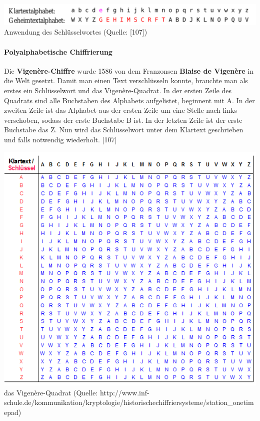 \documentclass[12pt,a4paper]{report}
\begin{document}
\begin{onehalfspace}
\begin{center}
\includegraphics[scale=0.38]{img/schluesselwortes.png}\\
Anwendung des Schlüsselwortes (Quelle: [107])
\end{center}

\newpage
\paragraph{Polyalphabetische Chiffrierung}

Die \textbf{Vigenère-Chiffre} wurde 1586 von dem Franzonsen \textbf{Blaise de Vigenère} in die Welt gesetzt. Damit man einen Text verschlüsseln konnte, brauchte man als erstes ein Schlüsselwort und das Vigenère-Quadrat. In der ersten Zeile des Quadrats sind alle Buchstaben des Alphabets aufgelistet, beginnent mit A. In der zweiten Zeile ist das Alphabet aus der ersten Zeile um eine Stelle nach links verschoben, sodass der erste Buchstabe B ist. In der letzten Zeile ist der erste Buchstabe das Z. Nun wird das Schlüsselwort unter dem Klartext geschrieben und falls notwendig wiederholt. [107]\\

\begin{center}
\includegraphics[scale=0.5]{img/vigere_quadrat.png}\\
das Vigenère-Quadrat (Quelle: http://www.inf-schule.de/kommunikation/kryptologie/historischechiffriersysteme/station\_onetimepad)
\end{center}


\end{onehalfspace}
\end{document}
